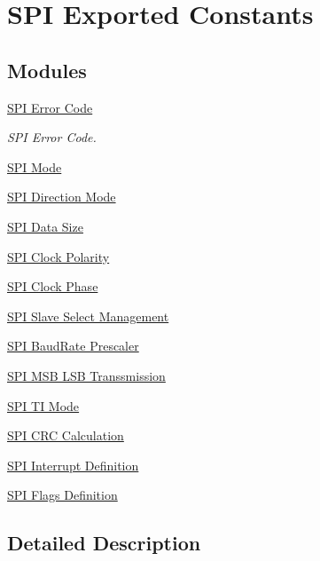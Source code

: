 \hypertarget{group___s_p_i___exported___constants}{}\section{S\+PI Exported Constants}
\label{group___s_p_i___exported___constants}
\subsection*{Modules}
\begin{DoxyCompactItemize}
\item 
\hyperlink{group___s_p_i___error___code}{S\+P\+I Error Code}
\begin{DoxyCompactList}\small\item\em S\+PI Error Code. \end{DoxyCompactList}\item 
\hyperlink{group___s_p_i__mode}{S\+P\+I Mode}
\item 
\hyperlink{group___s_p_i___direction__mode}{S\+P\+I Direction Mode}
\item 
\hyperlink{group___s_p_i__data__size}{S\+P\+I Data Size}
\item 
\hyperlink{group___s_p_i___clock___polarity}{S\+P\+I Clock Polarity}
\item 
\hyperlink{group___s_p_i___clock___phase}{S\+P\+I Clock Phase}
\item 
\hyperlink{group___s_p_i___slave___select__management}{S\+P\+I Slave Select Management}
\item 
\hyperlink{group___s_p_i___baud_rate___prescaler}{S\+P\+I Baud\+Rate Prescaler}
\item 
\hyperlink{group___s_p_i___m_s_b___l_s_b__transmission}{S\+P\+I M\+S\+B L\+S\+B Transsmission}
\item 
\hyperlink{group___s_p_i___t_i__mode}{S\+P\+I T\+I Mode}
\item 
\hyperlink{group___s_p_i___c_r_c___calculation}{S\+P\+I C\+R\+C Calculation}
\item 
\hyperlink{group___s_p_i___interrupt__definition}{S\+P\+I Interrupt Definition}
\item 
\hyperlink{group___s_p_i___flags__definition}{S\+P\+I Flags Definition}
\end{DoxyCompactItemize}


\subsection{Detailed Description}
